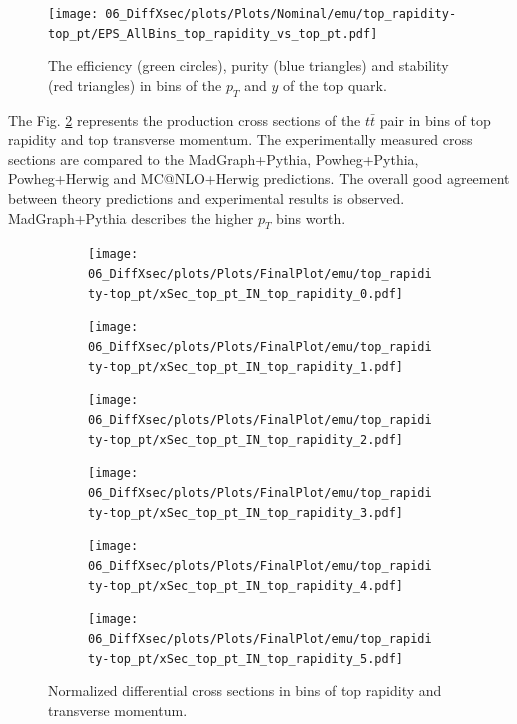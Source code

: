 \begin{figure}[t]
  \centering
  \texttt{[image: 06\_DiffXsec/plots/Plots/Nominal/emu/top\_rapidity-top\_pt/EPS\_AllBins\_top\_rapidity\_vs\_top\_pt.pdf]}
  \caption{The efficiency (green circles), purity (blue triangles) and stability (red triangles) in bins of the $p_{T}$ and $y$ of the top quark.}
  \label{fig:EPS_2D_y_pt}
\end{figure}

The Fig. \ref{fig:XS_2D_y_pt} represents the production cross sections of the $t\bar{t}$ pair in bins of top rapidity and top transverse momentum.
The experimentally measured cross sections are compared to the MadGraph+Pythia, Powheg+Pythia, Powheg+Herwig and MC@NLO+Herwig predictions.
The overall good agreement between theory predictions and experimental results is observed. MadGraph+Pythia describes the higher $p_{T}$ bins
worth.

\begin{figure}[t]
\centering
\begin{subfigure}
  \centering
  \texttt{[image: 06\_DiffXsec/plots/Plots/FinalPlot/emu/top\_rapidity-top\_pt/xSec\_top\_pt\_IN\_top\_rapidity\_0.pdf]}
\end{subfigure}
\begin{subfigure}
  \centering
  \texttt{[image: 06\_DiffXsec/plots/Plots/FinalPlot/emu/top\_rapidity-top\_pt/xSec\_top\_pt\_IN\_top\_rapidity\_1.pdf]}
\end{subfigure}
\begin{subfigure}
  \centering
  \texttt{[image: 06\_DiffXsec/plots/Plots/FinalPlot/emu/top\_rapidity-top\_pt/xSec\_top\_pt\_IN\_top\_rapidity\_2.pdf]}
\end{subfigure}
\begin{subfigure}
  \centering
  \texttt{[image: 06\_DiffXsec/plots/Plots/FinalPlot/emu/top\_rapidity-top\_pt/xSec\_top\_pt\_IN\_top\_rapidity\_3.pdf]}
\end{subfigure}
\begin{subfigure}
  \centering
  \texttt{[image: 06\_DiffXsec/plots/Plots/FinalPlot/emu/top\_rapidity-top\_pt/xSec\_top\_pt\_IN\_top\_rapidity\_4.pdf]}
\end{subfigure}
\begin{subfigure}
  \centering
  \texttt{[image: 06\_DiffXsec/plots/Plots/FinalPlot/emu/top\_rapidity-top\_pt/xSec\_top\_pt\_IN\_top\_rapidity\_5.pdf]}
\end{subfigure}
\caption{Normalized differential cross sections in bins of top rapidity and transverse momentum.}
\label{fig:XS_2D_y_pt}
\end{figure}

